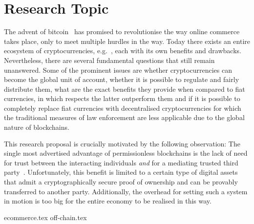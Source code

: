 \section{Research Topic}
  The advent of bitcoin~\cite{bitcoin} has promised to revolutionise the way online
  commerce takes place\cite{bitcoinrevolution}, only to meet multiple hurdles in the
  way\cite{bitcoinscaling,bitcoinwar}. Today there exists an entire ecosystem of
  cryptocurrencies, e.g.~\cite{ethereum,zcash,ouroboros}, each with its own benefits and
  drawbacks. Nevertheless, there are several fundamental questions that still remain
  unanswered. Some of the prominent issues are whether cryptocurrencies can become the
  global unit of account, whether it is possible to regulate and fairly distribute them,
  what are the exact benefits they provide when compared to fiat currencies, in which
  respects the latter outperform them and if it is possible to completely replace fiat
  currencies with decentralised cryptocurrencies for which the traditional measures of law
  enforcement are less applicable due to the global nature of blockchains.

  This research proposal is crucially motivated by the following observation: The single
  most advertised advantage of permissionless blockchains is the lack of need for trust
  between the interacting individuals \textit{and} for a mediating trusted third
  party~\cite{bitcoin}. Unfortunately, this benefit is limited to a certain type of
  digital assets that admit a cryptographically secure proof of ownership and can be
  provably transferred to another party. Additionally, the overhead for setting such a
  system in motion is too big for the entire economy to be realised in this way.

  {ecommerce.tex}
  {off-chain.tex}
